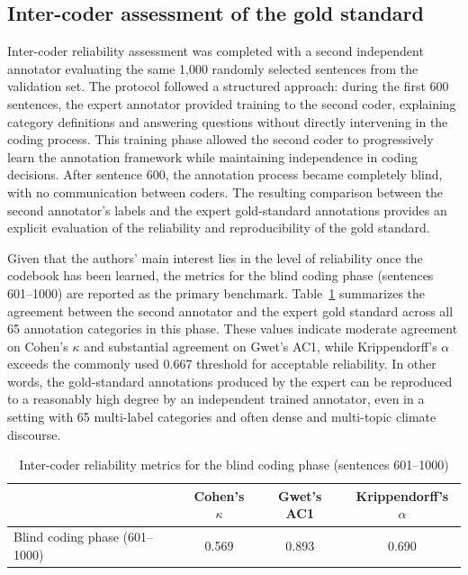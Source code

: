 \documentclass[12pt]{article}
\renewcommand\_{\texttt{\detokenize{_}\allowbreak}}
\begin{document}
\subsection{Inter-coder assessment of the gold standard}

Inter-coder reliability assessment was completed with a second independent annotator evaluating the same 1,000 randomly selected sentences from the validation set. The protocol followed a structured approach: during the first 600 sentences, the expert annotator provided training to the second coder, explaining category definitions and answering questions without directly intervening in the coding process. This training phase allowed the second coder to progressively learn the annotation framework while maintaining independence in coding decisions. After sentence 600, the annotation process became completely blind, with no communication between coders. The resulting comparison between the second annotator’s labels and the expert gold-standard annotations provides an explicit evaluation of the reliability and reproducibility of the gold standard.

Given that the authors' main interest lies in the level of reliability once the codebook has been learned, the metrics for the blind coding phase (sentences 601–1000) are reported as the primary benchmark. Table~\ref{tab:intercoder_metrics} summarizes the agreement between the second annotator and the expert gold standard across all 65 annotation categories in this phase. These values indicate moderate agreement on Cohen’s $\kappa$ and substantial agreement on Gwet’s AC1, while Krippendorff’s $\alpha$ exceeds the commonly used 0.667 threshold for acceptable reliability. In other words, the gold-standard annotations produced by the expert can be reproduced to a reasonably high degree by an independent trained annotator, even in a setting with 65 multi-label categories and often dense and multi-topic climate discourse.

\begin{table}[b!]
\centering
\caption{Inter-coder reliability metrics for the blind coding phase (sentences 601--1000)}
\label{tab:intercoder_metrics}
\begin{tabular}{lccc}
\toprule
 & Cohen's $\kappa$ & Gwet's AC1 & Krippendorff's $\alpha$ \\
\midrule
Blind coding phase (601--1000) & 0.569 & 0.893 & 0.690 \\
\bottomrule
\end{tabular}
\end{table}
\end{document}
